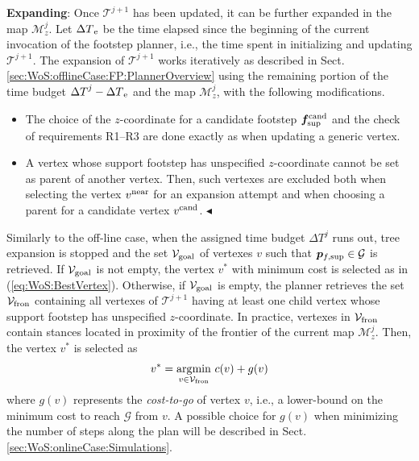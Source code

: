 {\bf Expanding}: Once $\mathcal{T}^{j+1}$ has been updated, it can be further expanded in the map $\mathcal{M}_z^j$.
Let ${\Delta T}_{\rm e}$ be the time elapsed since the beginning of the current invocation of the footstep planner, i.e., the time spent in initializing and updating $\mathcal{T}^{j+1}$.
The expansion of $\mathcal{T}^{j+1}$ works iteratively as described in Sect. \ref{sec:WoS:offlineCase:FP:PlannerOverview} using the remaining portion of the time budget ${\Delta T}^j - {\Delta T}_{\rm e}$ and the map $\mathcal{M}_z^j$, with the following modifications.
\begin{itemize}
    \item The choice of the $z$-coordinate for a candidate footstep ${\bm{f}}_{\rm sup}^{\rm cand}$ and the check of requirements R1--R3 are done exactly as when updating a generic vertex. 
    \item A vertex whose support footstep has unspecified $z$-coordinate cannot be set as parent of another vertex.
    Then, such vertexes are excluded both when selecting the vertex $v^{\rm near}$ for an expansion attempt and when choosing a parent for a candidate vertex $v^{\rm cand}$. \hfill $\blacktriangleleft$
\end{itemize} 

Similarly to the off-line case, when the assigned time budget ${\Delta T}^j$ runs out, tree expansion is stopped and the set ${\cal V}_{\rm goal}$ of vertexes $v$ such that ${\bm{p}}_{f,{\rm sup}} \in {\cal G}$ is retrieved.
%
If ${\cal V}_{\rm goal}$ is not empty, the vertex $v^*$ with minimum cost is selected as in (\ref{eq:WoS:BestVertex}).
%
Otherwise, if ${\cal V}_{\rm goal}$ is empty, the planner retrieves the set ${\cal V}_{\rm fron}$ containing all vertexes of $\mathcal{T}^{j+1}$ having at least one child vertex whose support footstep has unspecified $z$-coordinate.
In practice, vertexes in ${\cal V}_{\rm fron}$ contain stances located in proximity of the frontier of the current map $\mathcal{M}_z^j$.
Then, the vertex $v^*$ is selected as
\begin{equation}
    \label{eq:WoS:BestVertexSubgoal}
    v^* = \underset{v \in {\cal V}_{\rm fron}}{\arg\!\min} \ c(v)+g(v)
\end{equation}
where $g(v)$ represents the \textit{cost-to-go} of vertex $v$, i.e., a lower-bound on the minimum cost to reach $\mathcal{G}$ from $v$.
A possible choice for $g(v)$ when minimizing the number of steps along the plan will be described in Sect. \ref{sec:WoS:onlineCase:Simulations}.

